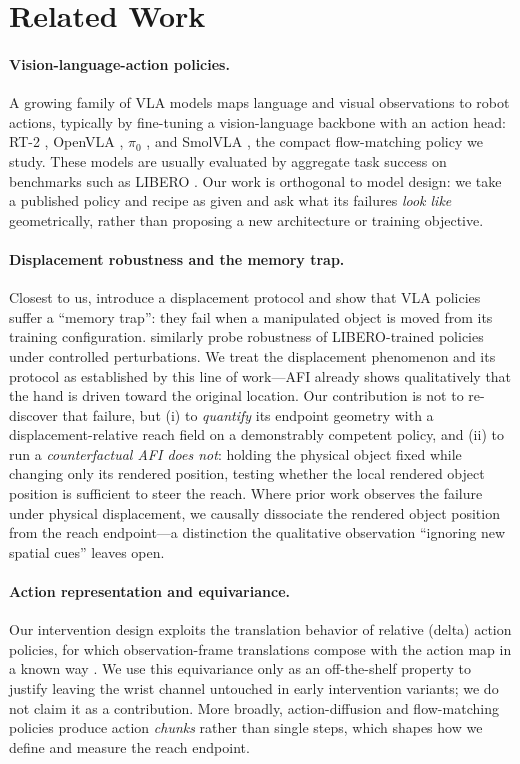 \section{Related Work}
\label{sec:related}

\paragraph{Vision-language-action policies.} A growing family of VLA models maps language and visual observations to robot actions, typically by fine-tuning a vision-language backbone with an action head: RT-2 \citep{brohan2023rt2}, OpenVLA \citep{kim2024openvla}, $\pi_0$ \citep{black2024pi0}, and SmolVLA \citep{shukor2025smolvla}, the compact flow-matching policy we study. These models are usually evaluated by aggregate task success on benchmarks such as LIBERO \citep{liu2023libero}. Our work is orthogonal to model design: we take a published policy and recipe as given and ask what its failures \emph{look like} geometrically, rather than proposing a new architecture or training objective.

\paragraph{Displacement robustness and the memory trap.} Closest to us, \citet{afi2025memorytrap} introduce a displacement protocol and show that VLA policies suffer a ``memory trap'': they fail when a manipulated object is moved from its training configuration. \citet{liberopro2025} similarly probe robustness of LIBERO-trained policies under controlled perturbations. We treat the displacement phenomenon and its protocol as established by this line of work---AFI already shows qualitatively that the hand is driven toward the original location. Our contribution is not to re-discover that failure, but (i) to \emph{quantify} its endpoint geometry with a displacement-relative reach field on a demonstrably competent policy, and (ii) to run a \emph{counterfactual AFI does not}: holding the physical object fixed while changing only its rendered position, testing whether the local rendered object position is sufficient to steer the reach. Where prior work observes the failure under physical displacement, we causally dissociate the rendered object position from the reach endpoint---a distinction the qualitative observation ``ignoring new spatial cues'' leaves open.

\paragraph{Action representation and equivariance.} Our intervention design exploits the translation behavior of relative (delta) action policies, for which observation-frame translations compose with the action map in a known way \citep{wang2025equivariant}. We use this equivariance only as an off-the-shelf property to justify leaving the wrist channel untouched in early intervention variants; we do not claim it as a contribution. More broadly, action-diffusion and flow-matching policies \citep{chi2023diffusion,black2024pi0,shukor2025smolvla} produce action \emph{chunks} rather than single steps, which shapes how we define and measure the reach endpoint.

